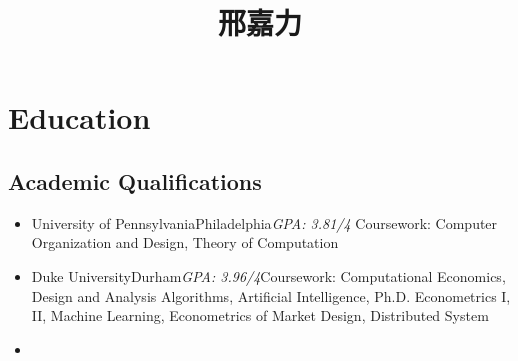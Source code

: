 \documentclass[12pt,a4paper,sans,colorlinks]{moderncv}        %
\title{邢嘉力}                               %
\begin{document}
\makecvtitle


\section{Education}

\vspace{5pt}

\subsection{Academic Qualifications}

\vspace{5pt}

\begin{itemize}
	
	
	\item{\cventry{Jan.2021--Present}{%
				Ph.D. Computer and Information Science}
			{University of Pennsylvania}{Philadelphia}{\textit{GPA: 3.81/4 }}{Coursework: Computer Organization and Design, Theory of Computation}}  %
	
%		

\item{\cventry{Sept.2018--May\,2020}{%
M.S. Economics \& Computation}
{Duke University}{Durham}{\textit{GPA: 3.96/4}}{Coursework: Computational Economics, Design and Analysis Algorithms, Artificial Intelligence, Ph.D. Econometrics I, II, Machine Learning, Econometrics of Market Design, Distributed System}}  %
	
	\item{}

\end{itemize}
\end{document}
